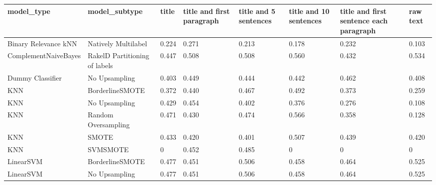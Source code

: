 \begin{tabular}{llllllll}
\toprule
                     model\_type &                 model\_subtype & title & title and first paragraph & title and 5 sentences & title and 10 sentences & title and first sentence each paragraph &  raw text \\
\midrule
           Binary Relevance kNN &           Natively Multilabel & 0.224 &                     0.271 &                 0.213 &                  0.178 &                                   0.232 &     0.103 \\
           ComplementNaiveBayes & RakelD Partitioning of labels & 0.447 &                     0.508 &                 0.508 &                  0.560 &                                   0.432 &     0.534 \\
               Dummy Classifier &                 No Upsampling & 0.403 &                     0.449 &                 0.444 &                  0.442 &                                   0.462 &     0.408 \\
                            KNN &               BorderlineSMOTE & 0.372 &                     0.440 &                 0.467 &                  0.492 &                                   0.373 &     0.259 \\
                            KNN &                 No Upsampling & 0.429 &                     0.454 &                 0.402 &                  0.376 &                                   0.276 &     0.108 \\
                            KNN &           Random Oversampling & 0.471 &                     0.430 &                 0.474 &                  0.566 &                                   0.358 &     0.128 \\
                            KNN &                         SMOTE & 0.433 &                     0.420 &                 0.401 &                  0.507 &                                   0.439 &     0.420 \\
                            KNN &                      SVMSMOTE &     0 &                     0.452 &                 0.485 &                      0 &                                       0 &         0 \\
                      LinearSVM &               BorderlineSMOTE & 0.477 &                     0.451 &                 0.506 &                  0.458 &                                   0.464 &     0.525 \\
                      LinearSVM &                 No Upsampling & 0.477 &                     0.451 &                 0.506 &                  0.458 &                                   0.464 &     0.525 \\

\end{tabular}
